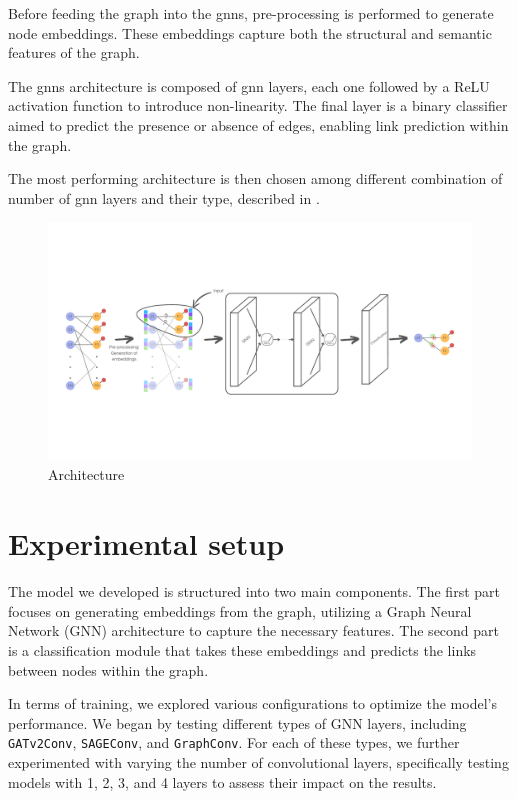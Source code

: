 \documentclass[11pt]{article}
\begin{document}
Before feeding the graph into the \acp{gnn}, pre-processing is performed to 
generate node embeddings. 
These embeddings capture both the structural and semantic features of the graph.

The \acp{gnn} architecture is composed of \ac{gnn} layers, each one followed by a ReLU activation 
function to introduce non-linearity. The final layer is a binary classifier 
aimed to predict the presence or absence of edges, enabling link prediction within the 
graph.

The most performing architecture is then chosen among different combination of number of \ac{gnn} layers and their type, described in .


\begin{figure}
  \centering
  \includegraphics[width=1\linewidth]{figures/architecture.pdf}

  \caption{
    Architecture
  }
  \label{fig:architecture}
\end{figure}

\section{Experimental setup}\label{sec:experimental-setup}

The model we developed is structured into two main components. 
%
The first part focuses on generating embeddings from the graph, 
  utilizing a Graph Neural Network (GNN) architecture to capture the necessary features. 
%  
The second part is a classification module that takes these embeddings and predicts the links 
  between nodes within the graph.

In terms of training, we explored various configurations to optimize the model's performance.
%
We began by testing different types of GNN layers, including \texttt{GATv2Conv}, \texttt{SAGEConv}, and \texttt{GraphConv}. 
%
For each of these types, we further experimented with varying the number of convolutional layers, 
  specifically testing models with 1, 2, 3, and 4 layers to assess their impact on the results.
\end{document}
